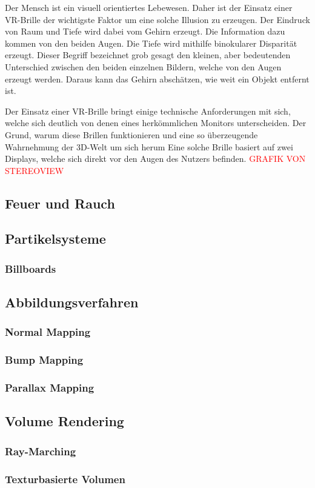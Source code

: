 Der Mensch ist ein visuell orientiertes Lebewesen. Daher ist der Einsatz einer VR-Brille 
der wichtigste Faktor um eine solche Illusion zu erzeugen. Der Eindruck von Raum und Tiefe wird
dabei vom Gehirn erzeugt. Die Information dazu kommen von den beiden Augen. Die Tiefe wird mithilfe 
binokularer Disparität erzeugt. Dieser Begriff bezeichnet grob gesagt den kleinen, aber bedeutenden
Unterschied zwischen den beiden einzelnen Bildern, welche von den Augen erzeugt werden. Daraus kann das Gehirn
abschätzen, wie weit ein Objekt entfernt ist. \parencite{Tauer2010}


Der Einsatz einer VR-Brille bringt einige technische Anforderungen mit sich, welche sich deutlich
von denen eines herkömmlichen Monitors unterscheiden. Der Grund, warum diese Brillen funktionieren und eine
so überzeugende Wahrnehmung der 3D-Welt um sich herum
Eine solche Brille basiert auf zwei Displays, welche
sich direkt vor den Augen des Nutzers befinden. \textcolor{red}{GRAFIK VON STEREOVIEW}


\subsection{Feuer und Rauch}
\subsection{Partikelsysteme}
\subsubsection{Billboards}
\subsection{Abbildungsverfahren}
\subsubsection{Normal Mapping}
\subsubsection{Bump Mapping}
\subsubsection{Parallax Mapping}
\subsection{Volume Rendering}
\subsubsection{Ray-Marching}
\subsubsection{Texturbasierte Volumen}


\newpage
